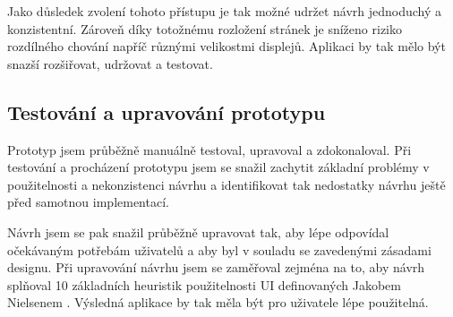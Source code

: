 Jako důsledek zvolení tohoto přístupu je tak možné udržet návrh jednoduchý a konzistentní. Zároveň díky totožnému rozložení stránek je sníženo riziko rozdílného chování napříč různými velikostmi displejů. Aplikaci by tak mělo být snazší rozšiřovat, udržovat a testovat.

\subsection{Testování a upravování prototypu}

Prototyp jsem průběžně manuálně testoval, upravoval a zdokonaloval. Při testování a procházení prototypu jsem se snažil zachytit základní problémy v použitelnosti a nekonzistenci návrhu a identifikovat tak nedostatky návrhu ještě před samotnou implementací.

Návrh jsem se pak snažil průběžně upravovat tak, aby lépe odpovídal očekávaným potřebám uživatelů a aby byl v souladu se zavedenými zásadami designu. Při upravování návrhu jsem se zaměřoval zejména na to, aby návrh splňoval 10 základních heuristik použitelnosti UI definovaných Jakobem Nielsenem \cite{Nielsen10Heuristics}. Výsledná aplikace by tak měla být pro uživatele lépe použitelná.
